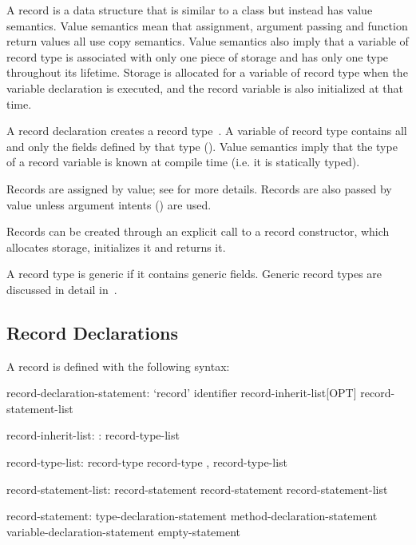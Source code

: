 \label{Records}

A record is a data structure that is similar to a class but instead has value
semantics.  Value semantics mean that assignment, argument passing and function
return values all use copy semantics.  Value semantics also imply that a
variable of record type is associated with only one piece of storage and has
only one type throughout its lifetime.  Storage is allocated for a variable of
record type when the variable declaration is executed, and the record variable
is also initialized at that time.

A record declaration creates a record type~.  A
variable of record type contains all and only the fields defined by that type
().  Value semantics imply that the type of a record variable
is known at compile time (i.e. it is statically typed).  

Records are assigned by value;
see  for more details.  Records are also passed
by value unless argument intents () are used.

Records can be created through an explicit call to a record
constructor, which allocates storage, initializes
it and returns it.  

A record type is generic if it contains generic fields.  Generic record types
are discussed in detail in~.

\subsection{Record Declarations}
\label{Record_Declarations}

A record is defined with the following syntax:
\begin{syntax}
record-declaration-statement:
  `record' identifier record-inherit-list[OPT] {
    record-statement-list }

record-inherit-list:
  : record-type-list

record-type-list:
  record-type
  record-type , record-type-list

record-statement-list:
  record-statement
  record-statement record-statement-list

record-statement:
  type-declaration-statement
  method-declaration-statement
  variable-declaration-statement
  empty-statement
\end{syntax}

